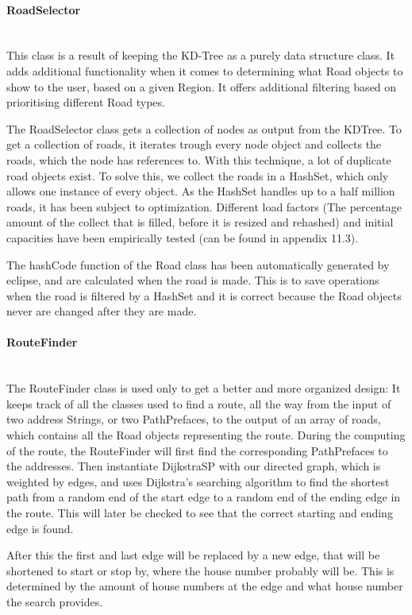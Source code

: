 \documentclass[a4paper,10pt,titlepage]{article}
\begin{document}
				
				\paragraph{RoadSelector}\mbox{}\\
This class is a result of keeping the KD-Tree as a purely data structure class. It adds additional functionality when it comes to determining what Road objects to show to the user, based on a given Region. It offers additional filtering based on prioritising different Road types.

The RoadSelector class gets a collection of nodes as output from the KDTree. To get a collection of roads, it iterates trough every node object and collects the roads, which the node has references to. With this technique, a lot of duplicate road objects exist. To solve this, we collect the roads in a HashSet, which only allows one instance of every object. As the HashSet handles up to a half million roads, it has been subject to optimization. Different load factors (The percentage amount of the collect that is filled, before it is resized and rehashed) and initial capacities have been empirically tested (can be found in appendix 11.3).

The hashCode function of the Road class has been automatically generated by eclipse, and are calculated when the road is made. This is to save operations when the road is filtered by a HashSet and it is correct because the Road objects never are changed after they are made.
				
				\paragraph{RouteFinder}\mbox{}\\
The RouteFinder class is used only to get a better and more organized design: It keeps track of all the classes used to find a route, all the way from the input of two address Strings, or two PathPrefaces, to the output of an array of roads, which contains all the Road objects representing the route. During the computing of the route, the RouteFinder will first find the corresponding PathPrefaces to the addresses. Then instantiate DijkstraSP with our directed graph, which is weighted by edges, and uses Dijkstra’s searching algorithm to find the shortest path from a random end of the start edge to a random end of the ending edge in the route. This will later be checked to see that the correct starting and ending edge is found.

After this the first and last edge will be replaced by a new edge, that will be shortened to start or stop by, where the house number probably will be. This is determined by the amount of house numbers at the edge and what house number the search provides.
\end{document}
